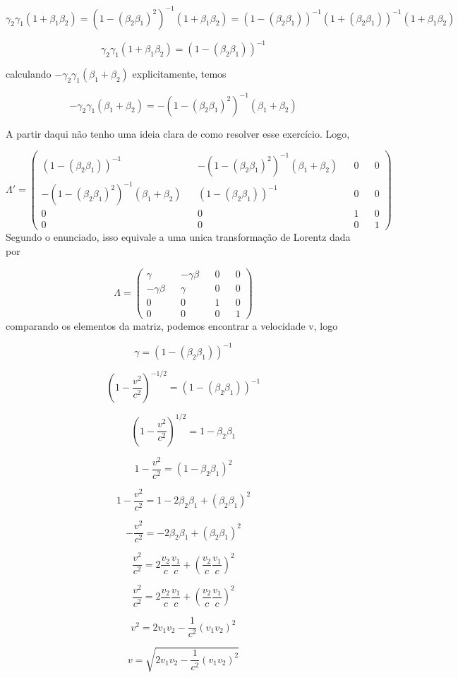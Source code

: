 \documentclass[10pt,a4paper]{article}
\begin{document}
$$\gamma_2\gamma_1(1+\beta_1\beta_2) =(1 -(\beta_2\beta_1)^2)^{-1}(1+\beta_1\beta_2)= (1 -(\beta_2\beta_1))^{-1}(1 +(\beta_2\beta_1))^{-1}(1+\beta_1\beta_2)$$

$$\gamma_2\gamma_1(1+\beta_1\beta_2) = (1 -(\beta_2\beta_1))^{-1}$$

calculando $-\gamma_2\gamma_1(\beta_1+\beta_2)  $ explicitamente, temos

$$-\gamma_2\gamma_1(\beta_1+\beta_2)=- (1 -(\beta_2\beta_1)^2)^{-1} (\beta_1+\beta_2)$$

A partir daqui não tenho uma ideia clara de como resolver esse exercício.
Logo,

\begin{equation}\nonumber
	\Lambda' = \left(\begin{matrix}
		(1 -(\beta_2\beta_1))^{-1}&&-(1-(\beta_2\beta_1)^2)^{-1} (\beta_1+\beta_2)&&0&&0\\
		-(1-(\beta_2\beta_1)^2)^{-1} (\beta_1+\beta_2)&&(1 -(\beta_2\beta_1))^{-1}&&0&&0\\
		0&&0&&1&&0\\
		0&&0&&0&&1
	\end{matrix}\right)
\end{equation}
Segundo o enunciado, isso equivale a uma unica transformação de Lorentz dada por

$$\Lambda = \left(\begin{matrix}
	\gamma&&-\gamma\beta&&0&&0\\
	-\gamma\beta&&\gamma&&0&&0\\
	0&&0&&1&&0\\
	0&&0&&0&&1
\end{matrix}\right)$$
comparando os elementos da matriz, podemos encontrar a velocidade v, logo

$$\gamma = (1 -(\beta_2\beta_1))^{-1}$$

$$(1- \dfrac{v^2}{c^2})^{-1/2} = (1 -(\beta_2\beta_1))^{-1}$$

$$(1- \dfrac{v^2}{c^2})^{1/2} = 1 -\beta_2\beta_1$$

$$1- \dfrac{v^2}{c^2} = (1 -\beta_2\beta_1)^2$$

$$1- \dfrac{v^2}{c^2} = 1 -2\beta_2\beta_1+(\beta_2\beta_1)^2$$

$$- \dfrac{v^2}{c^2} =  -2\beta_2\beta_1+(\beta_2\beta_1)^2$$

$$\dfrac{v^2}{c^2} =  2\dfrac{v_2}{c}\dfrac{v_1}{c}+(\dfrac{v_2}{c}\dfrac{v_1}{c})^2$$

$$\dfrac{v^2}{c^2} =  2\dfrac{v_2}{c}\dfrac{v_1}{c}+(\dfrac{v_2}{c}\dfrac{v_1}{c})^2$$

$$v^2 =  2v_1v_2-\frac{1}{c^2}(v_1v_2)^2$$

$$v =  \sqrt{2v_1v_2-\frac{1}{c^2}(v_1v_2)^2}$$
\end{document}
